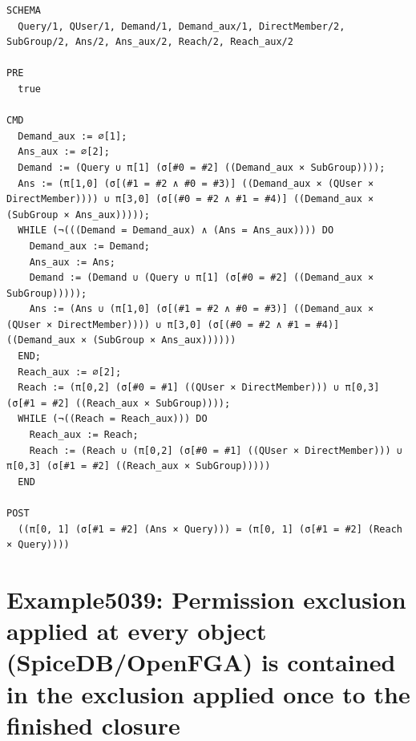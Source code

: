 \documentclass[10pt]{article}
\begin{document}
\begin{Verbatim}[fontsize=\scriptsize,breaklines=true,breakanywhere=true,frame=single,framesep=1.5mm]
SCHEMA
  Query/1, QUser/1, Demand/1, Demand_aux/1, DirectMember/2, SubGroup/2, Ans/2, Ans_aux/2, Reach/2, Reach_aux/2

PRE
  true

CMD
  Demand_aux := ∅[1];
  Ans_aux := ∅[2];
  Demand := (Query ∪ π[1] (σ[#0 = #2] ((Demand_aux × SubGroup))));
  Ans := (π[1,0] (σ[(#1 = #2 ∧ #0 = #3)] ((Demand_aux × (QUser × DirectMember)))) ∪ π[3,0] (σ[(#0 = #2 ∧ #1 = #4)] ((Demand_aux × (SubGroup × Ans_aux)))));
  WHILE (¬(((Demand = Demand_aux) ∧ (Ans = Ans_aux)))) DO
    Demand_aux := Demand;
    Ans_aux := Ans;
    Demand := (Demand ∪ (Query ∪ π[1] (σ[#0 = #2] ((Demand_aux × SubGroup)))));
    Ans := (Ans ∪ (π[1,0] (σ[(#1 = #2 ∧ #0 = #3)] ((Demand_aux × (QUser × DirectMember)))) ∪ π[3,0] (σ[(#0 = #2 ∧ #1 = #4)] ((Demand_aux × (SubGroup × Ans_aux))))))
  END;
  Reach_aux := ∅[2];
  Reach := (π[0,2] (σ[#0 = #1] ((QUser × DirectMember))) ∪ π[0,3] (σ[#1 = #2] ((Reach_aux × SubGroup))));
  WHILE (¬((Reach = Reach_aux))) DO
    Reach_aux := Reach;
    Reach := (Reach ∪ (π[0,2] (σ[#0 = #1] ((QUser × DirectMember))) ∪ π[0,3] (σ[#1 = #2] ((Reach_aux × SubGroup)))))
  END

POST
  ((π[0, 1] (σ[#1 = #2] (Ans × Query))) = (π[0, 1] (σ[#1 = #2] (Reach × Query))))
\end{Verbatim}

\Needspace{0.45\textheight}

\section{Example5039: Permission exclusion applied at every object (SpiceDB/OpenFGA) is contained in the exclusion applied once to the finished closure}\label{case:Example5039}
\end{document}
